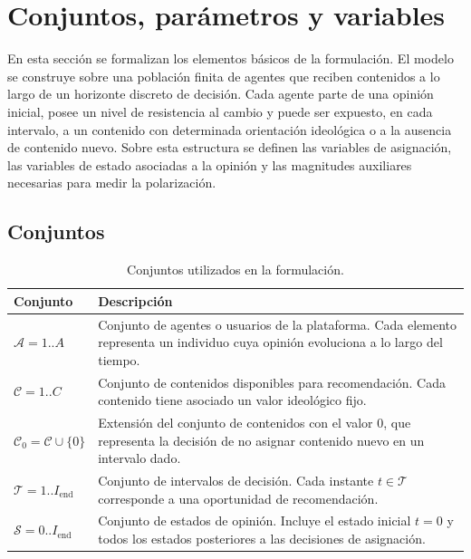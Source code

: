 \documentclass[10pt,letterpaper]{article}
\begin{document}
\section{Conjuntos, par\'ametros y variables}

En esta secci\'on se formalizan los elementos b\'asicos de la formulaci\'on. El modelo se construye sobre una poblaci\'on finita de agentes que reciben contenidos a lo largo de un horizonte discreto de decisi\'on. Cada agente parte de una opini\'on inicial, posee un nivel de resistencia al cambio y puede ser expuesto, en cada intervalo, a un contenido con determinada orientaci\'on ideol\'ogica o a la ausencia de contenido nuevo. Sobre esta estructura se definen las variables de asignaci\'on, las variables de estado asociadas a la opini\'on y las magnitudes auxiliares necesarias para medir la polarizaci\'on.

\subsection{Conjuntos}

\begin{table}[H]
\centering
\caption{Conjuntos utilizados en la formulaci\'on.}
\begin{tabularx}{\linewidth}{lY}
\toprule
\textbf{Conjunto} & \textbf{Descripci\'on} \\
\midrule
\(\mathcal{A}=1..A\) & Conjunto de agentes o usuarios de la plataforma. Cada elemento representa un individuo cuya opini\'on evoluciona a lo largo del tiempo. \\
\(\mathcal{C}=1..C\) & Conjunto de contenidos disponibles para recomendaci\'on. Cada contenido tiene asociado un valor ideol\'ogico fijo. \\
\(\mathcal{C}_0=\mathcal{C}\cup\{0\}\) & Extensi\'on del conjunto de contenidos con el valor \(0\), que representa la decisi\'on de no asignar contenido nuevo en un intervalo dado. \\
\(\mathcal{T}=1..I_{\text{end}}\) & Conjunto de intervalos de decisi\'on. Cada instante \(t\in\mathcal{T}\) corresponde a una oportunidad de recomendaci\'on. \\
\(\mathcal{S}=0..I_{\text{end}}\) & Conjunto de estados de opini\'on. Incluye el estado inicial \(t=0\) y todos los estados posteriores a las decisiones de asignaci\'on. \\
\bottomrule
\end{tabularx}
\end{table}
\end{document}
